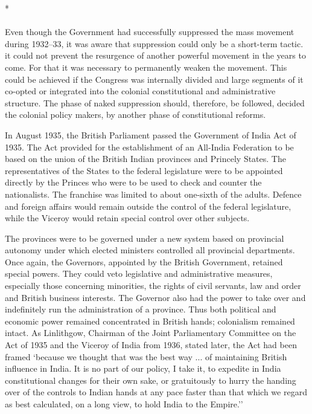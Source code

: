 \begin{center}*\end{center}

\paragraph*{}


Even though the Government had successfully suppressed the mass movement during 1932--33, it was aware that suppression could only be a short-term tactic. it could not prevent the resurgence of another powerful movement in the years to come. For that it was necessary to permanently weaken the movement. This could be achieved if the Congress was internally divided and large segments of it co-opted or integrated into the colonial constitutional and administrative structure. The phase of naked suppression should, therefore, be followed, decided the colonial policy makers, by another phase of constitutional reforms. 

In August 1935, the British Parliament passed the Government of India Act of 1935. The Act provided for the establishment of an All-India Federation to be based on the union of the British Indian provinces and Princely States. The representatives of the States to the federal legislature were to be appointed directly by the Princes who were to be used to check and counter the nationalists. The franchise was limited to about one-sixth of the adults. Defence and foreign affairs would remain outside the control of the federal legislature, while the Viceroy would retain special control over other subjects. 

The provinces were to be governed under a new system based on provincial autonomy under which elected ministers controlled all provincial departments. Once again, the Governors, appointed by the British Government, retained special powers. They could veto legislative and administrative measures, especially those concerning minorities, the rights of civil servants, law and order and British business interests. The Governor also had the power to take over and indefinitely run the administration of a province. Thus both political and economic power remained concentrated in British hands; colonialism remained intact. As Linlithgow, Chairman of the Joint Parliamentary Committee on the Act of 1935 and the Viceroy of India from 1936, stated later, the Act had been framed `because we thought that was the best way ... of maintaining British influence in India. It is no part of our policy, I take it, to expedite in India constitutional changes for their own sake, or gratuitously to hurry the handing over of the controls to Indian hands at any pace faster than that which we regard as best calculated, on a long view, to hold India to the Empire.'' 

